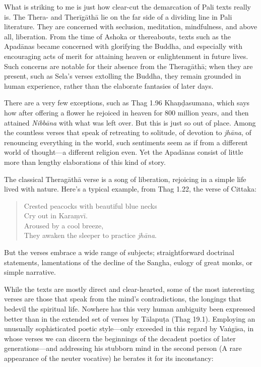 \documentclass[12pt,openany]{book}%
\begin{document}
What is striking to me is just how clear-cut the demarcation of Pali texts really is. The Thera- and \textsanskrit{Therīgāthā} lie on the far side of a dividing line in Pali literature. They are concerned with seclusion, meditation, mindfulness, and above all, liberation. From the time of Ashoka or thereabouts, texts such as the \textsanskrit{Apadānas} became concerned with glorifying the Buddha, and especially with encouraging acts of merit for attaining heaven or enlightenment in future lives. Such concerns are notable for their absence from the \textsanskrit{Theragāthā}; when they are present, such as Sela’s verses extolling the Buddha, they remain grounded in human experience, rather than the elaborate fantasies of later days.

There are a very few exceptions, such as Thag 1.96 \textsanskrit{Khaṇḍasumana}, which says how after offering a flower he rejoiced in heaven for 800 million years, and then attained \textit{\textsanskrit{Nibbāna}} with what was left over. But this is just so out of place. Among the countless verses that speak of retreating to solitude, of devotion to \textit{\textsanskrit{jhāna}}, of renouncing everything in the world, such sentiments seem as if from a different world of thought—a different religion even. Yet the \textsanskrit{Apadānas} consist of little more than lengthy elaborations of this kind of story.

The classical \textsanskrit{Theragāthā} verse is a song of liberation, rejoicing in a simple life lived with nature. Here’s a typical example, from Thag 1.22, the verse of Cittaka:

\begin{quotation}%
Crested peacocks with beautiful blue necks\\

Cry out in \textsanskrit{Karaṃvī}.\\

Aroused by a cool breeze,\\

They awaken the sleeper to practice \textit{\textsanskrit{jhāna}}.

%
\end{quotation}

But the verses embrace a wide range of subjects; straightforward doctrinal statements, lamentations of the decline of the Sangha, eulogy of great monks, or simple narrative.

While the texts are mostly direct and clear-hearted, some of the most interesting verses are those that speak from the mind’s contradictions, the longings that bedevil the spiritual life. Nowhere has this very human ambiguity been expressed better than in the extended set of verses by \textsanskrit{Tālapuṭa} (Thag 19.1). Employing an unusually sophisticated poetic style—only exceeded in this regard by \textsanskrit{Vaṅgīsa}, in whose verses we can discern the beginnings of the decadent poetics of later generations—and addressing his stubborn mind in the second person (A rare appearance of the neuter vocative) he berates it for its inconstancy:
\end{document}
